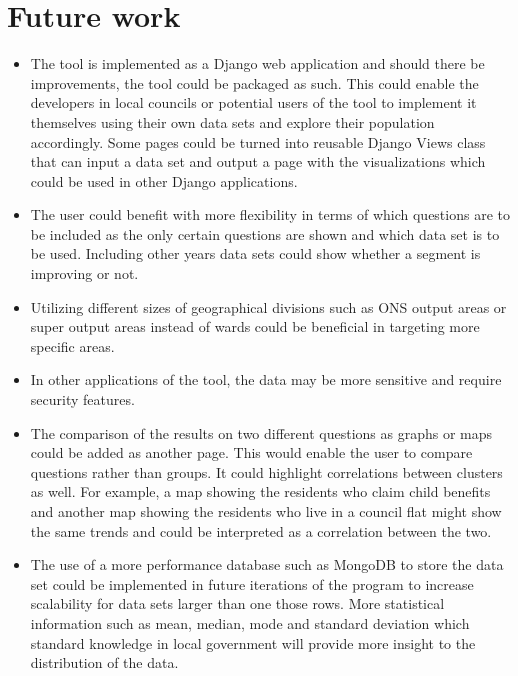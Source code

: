 \section{Future work}
\begin{itemize}
	\item The tool is implemented as a Django web application and should there be improvements, the tool could be packaged as such. This could enable the developers in local councils or potential users of the tool to implement it themselves using their own data sets and explore their population accordingly. Some pages could be turned into reusable Django Views class that can input a data set and output a page with the visualizations which could be used in other Django applications.
	\item The user could benefit with more flexibility in terms of which questions are to be included as the only certain questions are shown and which data set is to be used. Including other years\textsc{} data sets could show whether a segment is improving or not.
	\item Utilizing different sizes of geographical divisions such as ONS\textsc{} output areas or super output areas instead of wards could be beneficial in targeting more specific areas.
	\item In other applications of the tool, the data may be more sensitive and require security features.
	\item The comparison of the results on two different questions as graphs or maps could be added as another page. This would enable the user to compare questions rather than groups. It could highlight correlations between clusters as well. For example, a map showing the residents who claim child benefits and another map showing the residents who live in a council flat might show the same trends and could be interpreted as a correlation between the two.
	\item The use of a more performance database such as MongoDB to store the data set could be implemented in future iterations of the program to increase scalability for data sets larger than one those rows.
More statistical information such as mean, median, mode and standard deviation which standard knowledge in local government will provide more insight to the distribution of the data.
\end{itemize}